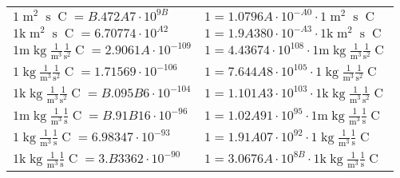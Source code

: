 \begin{center}
\begin{longtable}{l l}
{\color{black}$1 \bm{\mathrm{ }}{\operatorname{m}^2}{\operatorname{s}}{\operatorname{C}}{} = B.472A7\cdot10^{9B} $}   & {\color{black}$ 1 = 1.0796A\cdot10^{-A0} \cdot 1 \bm{\mathrm{ }}{\operatorname{m}^2}{\operatorname{s}}{\operatorname{C}}{}$}  \\
{\color{gray}$1 \bm{\mathrm{ k}}{\operatorname{m}^2}{\operatorname{s}}{\operatorname{C}}{} = 6.70774\cdot10^{A2} $}   & {\color{gray}$ 1 = 1.9A380\cdot10^{-A3} \cdot 1 \bm{\mathrm{ k}}{\operatorname{m}^2}{\operatorname{s}}{\operatorname{C}}{}$}  \\
\hline{\color{gray}$1 \bm{\mathrm{ m}}\operatorname{kg}\frac1{\operatorname{m}^3}\frac1{\operatorname{s}^2}{\operatorname{C}}{} = 2.9061A\cdot10^{-109} $}   & {\color{gray}$ 1 = 4.43674\cdot10^{108} \cdot 1 \bm{\mathrm{ m}}\operatorname{kg}\frac1{\operatorname{m}^3}\frac1{\operatorname{s}^2}{\operatorname{C}}{}$}  \\
{\color{black}$1 \bm{\mathrm{ }}\operatorname{kg}\frac1{\operatorname{m}^3}\frac1{\operatorname{s}^2}{\operatorname{C}}{} = 1.71569\cdot10^{-106} $}   & {\color{black}$ 1 = 7.644A8\cdot10^{105} \cdot 1 \bm{\mathrm{ }}\operatorname{kg}\frac1{\operatorname{m}^3}\frac1{\operatorname{s}^2}{\operatorname{C}}{}$}  \\
{\color{gray}$1 \bm{\mathrm{ k}}\operatorname{kg}\frac1{\operatorname{m}^3}\frac1{\operatorname{s}^2}{\operatorname{C}}{} = B.095B6\cdot10^{-104} $}   & {\color{gray}$ 1 = 1.101A3\cdot10^{103} \cdot 1 \bm{\mathrm{ k}}\operatorname{kg}\frac1{\operatorname{m}^3}\frac1{\operatorname{s}^2}{\operatorname{C}}{}$}  \\
{\color{gray}$1 \bm{\mathrm{ m}}\operatorname{kg}\frac1{\operatorname{m}^3}\frac1{\operatorname{s}}{\operatorname{C}}{} = B.91B16\cdot10^{-96} $}   & {\color{gray}$ 1 = 1.02A91\cdot10^{95} \cdot 1 \bm{\mathrm{ m}}\operatorname{kg}\frac1{\operatorname{m}^3}\frac1{\operatorname{s}}{\operatorname{C}}{}$}  \\
{\color{black}$1 \bm{\mathrm{ }}\operatorname{kg}\frac1{\operatorname{m}^3}\frac1{\operatorname{s}}{\operatorname{C}}{} = 6.98347\cdot10^{-93} $}   & {\color{black}$ 1 = 1.91A07\cdot10^{92} \cdot 1 \bm{\mathrm{ }}\operatorname{kg}\frac1{\operatorname{m}^3}\frac1{\operatorname{s}}{\operatorname{C}}{}$}  \\
{\color{gray}$1 \bm{\mathrm{ k}}\operatorname{kg}\frac1{\operatorname{m}^3}\frac1{\operatorname{s}}{\operatorname{C}}{} = 3.B3362\cdot10^{-90} $}   & {\color{gray}$ 1 = 3.0676A\cdot10^{8B} \cdot 1 \bm{\mathrm{ k}}\operatorname{kg}\frac1{\operatorname{m}^3}\frac1{\operatorname{s}}{\operatorname{C}}{}$}  \\

\end{longtable}
\end{center}

